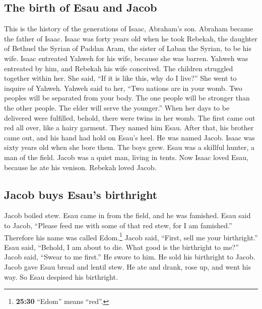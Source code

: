 \hypertarget{the-birth-of-esau-and-jacob}{%
\subsection{The birth of Esau and
Jacob}\label{the-birth-of-esau-and-jacob}}

 This is the history of the generations of Isaac,
Abraham's son. Abraham became the father of Isaac.  Isaac
was forty years old when he took Rebekah, the daughter of Bethuel the
Syrian of Paddan Aram, the sister of Laban the Syrian, to be his wife.
 Isaac entreated Yahweh for his wife, because she was
barren. Yahweh was entreated by him, and Rebekah his wife conceived.
 The children struggled together within her. She said,
``If it is like this, why do I live?'' She went to inquire of Yahweh.
 Yahweh said to her, ``Two nations are in your womb. Two
peoples will be separated from your body. The one people will be
stronger than the other people. The elder will serve the younger.''
 When her days to be delivered were fulfilled, behold,
there were twins in her womb.  The first came out red all
over, like a hairy garment. They named him Esau.  After
that, his brother came out, and his hand had hold on Esau's heel. He was
named Jacob. Isaac was sixty years old when she bore them.
 The boys grew. Esau was a skillful hunter, a man of the
field. Jacob was a quiet man, living in tents.  Now Isaac
loved Esau, because he ate his venison. Rebekah loved Jacob.

\hypertarget{jacob-buys-esaus-birthright}{%
\subsection{Jacob buys Esau's
birthright}\label{jacob-buys-esaus-birthright}}

 Jacob boiled stew. Esau came in from the field, and he
was famished.  Esau said to Jacob, ``Please feed me with
some of that red stew, for I am famished.'' Therefore his name was
called Edom.\footnote{\textbf{25:30} ``Edom'' means ``red''.}
 Jacob said, ``First, sell me your birthright.''
 Esau said, ``Behold, I am about to die. What good is the
birthright to me?''  Jacob said, ``Swear to me first.''
He swore to him. He sold his birthright to Jacob.  Jacob
gave Esau bread and lentil stew. He ate and drank, rose up, and went his
way. So Esau despised his birthright.

